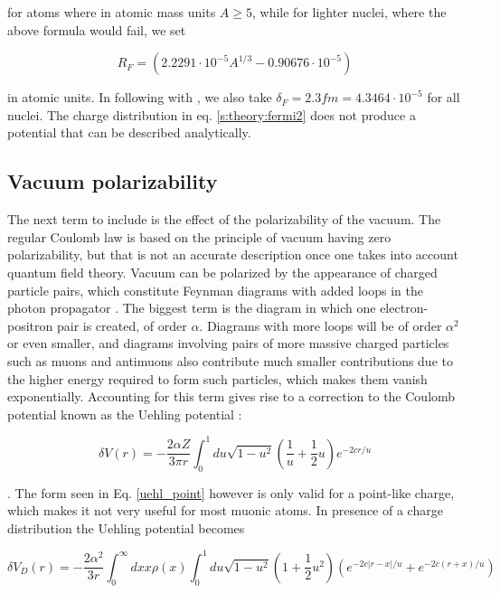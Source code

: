 \documentclass[]{report}
\begin{document}
for atoms where in atomic mass units $A \ge 5$, while for lighter nuclei, where the above formula would fail, we set

\begin{equation}\label{s:theory:fermi2radius_light}
R_F = (2.2291\cdot10^{-5}A^{1/3}-0.90676\cdot10^{-5})
\end{equation}

in atomic units. In following with \cite{visscher1997}, we also take $\delta_F = 2.3 fm = 4.3464\cdot10^{-5}$ for all nuclei. The charge distribution in eq. \ref{s:theory:fermi2} does not produce a potential that can be described analytically.

\subsection{Vacuum polarizability}\label{vacpot}

The next term to include is the effect of the polarizability of the vacuum. The regular Coulomb law is based on the principle of vacuum having zero polarizability, but that is not an accurate description once one takes into account quantum field theory. Vacuum can be polarized by the appearance of charged particle pairs, which constitute Feynman diagrams with added loops in the photon propagator \cite{borie1982}. The biggest term is the diagram in which one electron-positron pair is created, of order $\alpha$. Diagrams with more loops will be of order $\alpha^2$ or even smaller, and diagrams involving pairs of more massive charged particles such as muons and antimuons also contribute much smaller contributions due to the higher energy required to form such particles, which makes them vanish exponentially. Accounting for this term gives rise to a correction to the Coulomb potential known as the Uehling potential \cite{johnson2001}:

\begin{equation}\label{uehl_point}
\delta V(r) = -\frac{2\alpha Z}{3\pi r}\int_0^1 du \sqrt{1-u^2}\left(\frac{1}{u}+\frac{1}{2}u\right)e^{-2cr/u}
\end{equation}

. The form seen in Eq. \ref{uehl_point} however is only valid for a point-like charge, which makes it not very useful for most muonic atoms. In presence of a charge distribution the Uehling potential becomes

\begin{equation}\label{uehl_distr}
\delta V_D(r) = -\frac{2\alpha^2}{3 r}\int_0^\infty dx x \rho(x)\int_0^1 du \sqrt{1-u^2}\left(1+\frac{1}{2}u^2\right)\left(e^{-2c|r-x|/u}+e^{-2c(r+x)/u}\right)
\end{equation}
\end{document}
